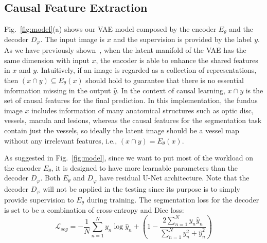 \documentclass[]{spie}  %
\begin{document}
\subsection{Causal Feature Extraction}
Fig.~\ref{fig:model}(a) shows our VAE model composed by the encoder $E_{\theta}$ and the decoder $D_{\varphi}$. The input image is $x$ and the supervision is provided by the label $y$. As we have previously shown~\cite{hu2021domain,hu2021life},  when the latent manifold of the VAE has the same dimension with input $x$, the encoder is able to enhance the shared features in $x$ and $y$. Intuitively, if an image is regarded as a collection of representations, then $(x \cap y) \subseteq E_{\theta}(x)$ should hold to guarantee that there is no essential information missing in the output $\hat{y}$. In the context of causal learning, $x \cap y$ is the set of causal features for the final prediction. In this implementation, the fundus image $x$ includes information of many anatomical structures such as optic disc, vessels, macula and lesions, whereas the causal features for the segmentation task contain just the vessels, so ideally the latent image should be a vessel map without any irrelevant features, i.e., $(x \cap y) = E_{\theta}(x)$.

As suggested in Fig.~\ref{fig:model}, since we want to put most of the workload on the encoder $E_{\theta}$, it is designed to have more learnable parameters than the decoder $D_{\varphi}$. Both $E_{\theta}$ and $D_{\varphi}$ have residual U-Net architecture. Note that the decoder $D_{\varphi}$ will not be applied in the testing since its purpose is to simply provide supervision to $E_{\theta}$ during training. The segmentation loss for the decoder is set to be a combination of cross-entropy and Dice loss:
\begin{equation}
    \mathcal{L}_{seg}=-\frac{1}{N}\sum_{n=1}^Ny_n\log\hat{y}_n + \left(1-\frac{2\sum_{n=1}^N y_n\hat{y}_n}{\sum_{n=1}^N y_{n}^{2}+\hat{y}_n^2}\right)
\end{equation}
\end{document}
